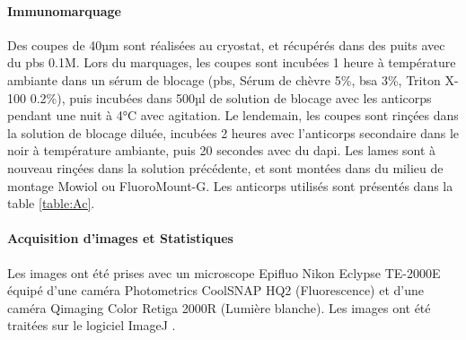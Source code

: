 \paragraph{Immunomarquage}	
\label{sec:immunomarquage}
	Des coupes de 40µm sont réalisées au cryostat, et récupérés dans des puits avec du \acrshort{pbs} 0.1M. Lors du marquages, les coupes sont incubées 1 heure à température ambiante dans un sérum de blocage (\acrshort{pbs}, Sérum de chèvre 5\%, \acrshort{bsa} 3\%, Triton X-100 0.2\%), puis  incubées dans 500µl de solution de blocage avec les anticorps pendant une nuit à 4°C avec agitation. Le lendemain, les coupes sont rinçées dans la solution de blocage diluée, incubées 2 heures avec l'anticorps secondaire dans le noir à température ambiante, puis 20 secondes avec du \gls{dapi}. Les lames sont à nouveau rinçées dans la solution précédente, et sont montées dans du milieu de montage Mowiol ou FluoroMount-G\textregistered.
	Les anticorps utilisés sont présentés dans la table \ref{table:Ac}.

\begin{table}
\end{table} 
	
\paragraph{Acquisition d'images et Statistiques}
\label{sec:ImagesStats}
	Les images ont été prises avec un microscope Epifluo Nikon Eclypse TE-2000E équipé d'une caméra Photometrics CoolSNAP HQ2 (Fluorescence) et d'une caméra Qimaging Color Retiga 2000R (Lumière blanche).
	Les images ont été traitées sur le logiciel ImageJ \cite{Schneider2012}.